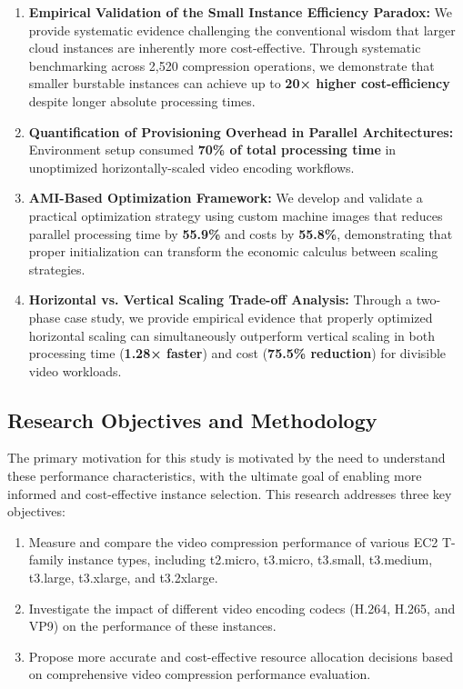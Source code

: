 \documentclass[conference]{IEEEtran}
\begin{document}
	\begin{enumerate}
		\item \textbf{Empirical Validation of the Small Instance Efficiency Paradox:} We provide systematic evidence challenging the conventional wisdom that larger cloud instances are inherently more cost-effective. Through systematic benchmarking across 2,520 compression operations, we demonstrate that smaller burstable instances can achieve up to \textbf{20× higher cost-efficiency} despite longer absolute processing times.
		
		\item \textbf{Quantification of Provisioning Overhead in Parallel Architectures:} Environment setup consumed \textbf{70\% of total processing time} in unoptimized horizontally-scaled video encoding workflows.
		
		\item \textbf{AMI-Based Optimization Framework:} We develop and validate a practical optimization strategy using custom machine images that reduces parallel processing time by \textbf{55.9\%} and costs by \textbf{55.8\%}, demonstrating that proper initialization can transform the economic calculus between scaling strategies.
		
		\item \textbf{Horizontal vs. Vertical Scaling Trade-off Analysis:} Through a two-phase case study, we provide empirical evidence that properly optimized horizontal scaling can simultaneously outperform vertical scaling in both processing time (\textbf{1.28× faster}) and cost (\textbf{75.5\% reduction}) for divisible video workloads.
	\end{enumerate}
	
	\subsection{Research Objectives and Methodology}
	
	The primary motivation for this study is motivated by the need to understand these performance characteristics, with the ultimate goal of enabling more informed and cost-effective instance selection. This research addresses three key objectives:
	\begin{enumerate}
		\item Measure and compare the video compression performance of various EC2 T-family instance types, including t2.micro, t3.micro, t3.small, t3.medium, t3.large, t3.xlarge, and t3.2xlarge.
		\item Investigate the impact of different video encoding codecs (H.264, H.265, and VP9) on the performance of these instances.
		\item Propose more accurate and cost-effective resource allocation decisions based on comprehensive video compression performance evaluation.
	\end{enumerate}
	
\end{document}
